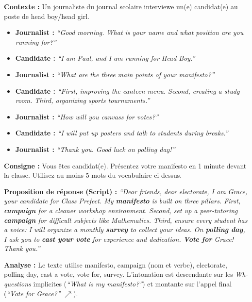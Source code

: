 \documentclass[11pt]{article}
\newcommand{\cle}[1]{{\popxbold\color{popdark}#1}}
\begin{document}
\begin{exemplebox}
\textbf{Contexte :} Un journaliste du journal scolaire interviewe un(e) candidat(e) au poste de \cle{head boy/head girl}.
\begin{itemize}
\item \textbf{Journalist :} \emph{``Good morning. What is your name and what position are you running for?''}
\item \textbf{Candidate :} \emph{``I am Paul, and I am running for Head Boy.''}
\item \textbf{Journalist :} \emph{``What are the three main points of your manifesto?''}
\item \textbf{Candidate :} \emph{``First, improving the canteen menu. Second, creating a study room. Third, organizing sports tournaments.''}
\item \textbf{Journalist :} \emph{``How will you canvass for votes?''}
\item \textbf{Candidate :} \emph{``I will put up posters and talk to students during breaks.''}
\item \textbf{Journalist :} \emph{``Thank you. Good luck on polling day!''}
\end{itemize}
\end{exemplebox}

\begin{exoresolu}
\textbf{Consigne :} Vous êtes candidat(e). Présentez votre manifesto en 1 minute devant la classe. Utilisez au moins 5 mots du vocabulaire ci-dessus.

\tcblower

\textbf{Proposition de réponse (Script) :}
\emph{``Dear friends, dear electorate, I am Grace, your candidate for Class Prefect. My \textbf{manifesto} is built on three pillars. First, \textbf{campaign} for a cleaner workshop environment. Second, set up a peer-tutoring \textbf{campaign} for difficult subjects like Mathematics. Third, ensure every student has a voice: I will organize a monthly \textbf{survey} to collect your ideas. On \textbf{polling day}, I ask you to \textbf{cast your vote} for experience and dedication. \textbf{Vote for} Grace! Thank you.''}

\textbf{Analyse :} Le texte utilise \cle{manifesto}, \cle{campaign} (nom et verbe), \cle{electorate}, \cle{polling day}, \cle{cast a vote}, \cle{vote for}, \cle{survey}. L'intonation est descendante sur les \emph{Wh-questions} implicites (\emph{``What is my manifesto?''}) et montante sur l'appel final (\emph{``Vote for Grace?''} $\nearrow$).
\end{exoresolu}
\end{document}
